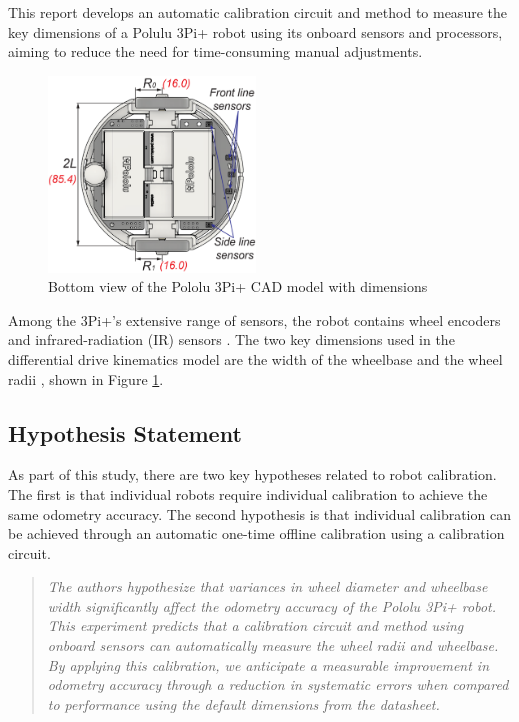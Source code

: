 \documentclass[conference]{IEEEtran}
\begin{document}
This report develops an automatic calibration circuit and method to measure the key dimensions of a Polulu 3Pi+ robot using its onboard sensors and processors, aiming to reduce the need for time-consuming manual adjustments. 

\begin{figure}[h!]
    \centering
    \includegraphics[width = 0.49\textwidth]{img/robot_schemtatic.png}
    \caption{Bottom view of the Pololu 3Pi+ CAD model with dimensions \cite{pololu_guide}}
    \label{fig:dimensions}
\end{figure}

Among the 3Pi+'s extensive range of sensors, the robot contains wheel encoders and infrared-radiation (IR) sensors \cite{pololu_guide}. 
The two key dimensions used in the differential drive kinematics model are the width of the wheelbase and the wheel radii \cite{pololu_guide}, shown in Figure \ref{fig:dimensions}.


\subsection{Hypothesis Statement}

As part of this study, there are two key hypotheses related to robot calibration. The first is that individual robots require individual calibration to achieve the same odometry accuracy. The second hypothesis is that individual calibration can be achieved through an automatic one-time offline calibration using a calibration circuit.

\begin{quote}
    \emph{
    The authors hypothesize that variances in wheel diameter and wheelbase width significantly affect the odometry accuracy of the Pololu 3Pi+ robot.
    This experiment predicts that a calibration circuit and method using onboard sensors can automatically measure the wheel radii and wheelbase.
    By applying this calibration, we anticipate a measurable improvement in odometry accuracy through a reduction in systematic errors when compared to performance using the default dimensions from the datasheet.
    }
\end{quote}
\end{document}
